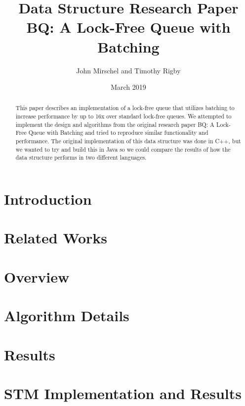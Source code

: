 \documentclass[12pt]{article}
\title{Data Structure Research Paper \\
    \large BQ: A Lock-Free Queue with Batching
}
\author{John Mirschel and Timothy Rigby}
\date{March 2019}
\begin{document}
\maketitle


\begin{abstract}
This paper describes an implementation of a lock-free queue that utilizes batching to increase performance by up to 16x over standard lock-free queues. We attempted to implement the design and algorithms from the original research paper BQ: A Lock-Free Queue with Batching  and tried to reproduce similar functionality and performance. The original implementation of this data structure was done in C++, but we wanted to try and build this in Java so we could compare the results of how the data structure performs in two different languages. 
\end{abstract}


\section{Introduction}


\section{Related Works}


\section{Overview}


\section{Algorithm Details}


\section{Results}


\section{STM Implementation and Results}


\newpage

\printbibliography
\end{document}
